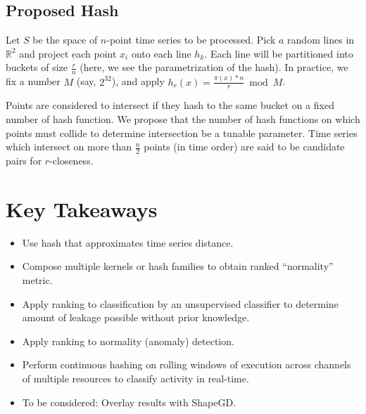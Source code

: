 \documentclass[a4paper]{article}
\begin{document}
\subsection{Proposed Hash}

Let $S$ be the space of $n$-point time series to be processed.
Pick $a$ random lines in $\mathbb{R}^2$ and project each point $x_i$ onto each line $h_k$.
Each line will be partitioned into buckets of size $\frac{r}{n}$ (here, we see the parametrization of the hash).
In practice, we fix a number $M$ (say, $2^{32}$), and apply $h_r(x) = \frac{\pi(x)*n}{r} \bmod M$. 

Points are considered to intersect if they hash to the same bucket on a fixed number of hash function.
We propose that the number of hash functions on which points must collide to determine intersection be a tunable parameter.
Time series which intersect on more than $\frac{n}{2}$ points (in time order) are said to be candidate pairs for $r$-closeness.

\section{Key Takeaways}

\begin{itemize}
    \item Use hash that approximates time series distance.
    \item Compose multiple kernels or hash families to obtain ranked ``normality'' metric.
    \item Apply ranking to classification by an unsupervised classifier to determine amount of leakage possible without prior knowledge.
    \item Apply ranking to normality (anomaly) detection.
    \item Perform continuous hashing on rolling windows of execution across channels of multiple resources to classify activity in real-time.
    \item To be considered: Overlay results with ShapeGD\@.
\end{itemize}



\end{document}
